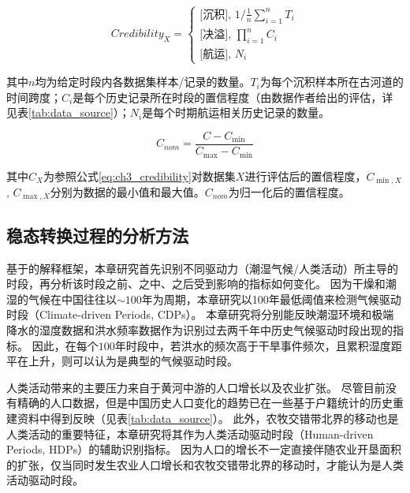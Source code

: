 

\begin{equation}
    \label{eq:ch3_credibility}
    Credibility_X = 
    \left\{\begin{array}{l}
        \text{[沉积], } 1 / \frac{1}{n} \sum_{i=1}^n T_i\\
        \text{[决溢], } \prod_{i=1}^n C_i\\
        \text{[航运], } N_i
    \end{array}\right.
\end{equation}

其中$n$均为给定时段内各数据集样本/记录的数量。$T_i$为每个沉积样本所在古河道的时间跨度；$C_i$是每个历史记录所在时段的置信程度（由数据作者给出的评估，详见表\ref{tab:data_source}）；$N_i$是每个时期航运相关历史记录的数量。

\begin{equation}
    \label{eq:ch3_normalize}
    C_{nom}=\frac{C-C_{\min}}{C_{\max}-C_{\min}}
\end{equation}

其中$C_{X}$为参照公式\ref{eq:ch3_credibility}对数据集$X$进行评估后的置信程度，$C_{\min, X}$, $C_{\max, X}$分别为数据的最小值和最大值。$C_{nom}$为归一化后的置信程度。

\subsection{稳态转换过程的分析方法}

基于的解释框架，本章研究首先识别不同驱动力（潮湿气候/人类活动）所主导的时段，再分析该时段之前、之中、之后受到影响的指标如何变化。
因为干燥和潮湿的气候在中国往往以$\sim100$年为周期\cite{GeQuanSheng2011}，本章研究以100年最低阈值来检测气候驱动时段（Climate-driven Periods, CDPs）。
本章研究将分别能反映潮湿环境和极端降水的湿度数据和洪水频率数据作为识别过去两千年中历史气候驱动时段出现的指标。
因此，在每个$100$年时段中，若洪水的频次高于干旱事件频次，且累积湿度距平在上升，则可以认为是典型的气候驱动时段。

人类活动带来的主要压力来自于黄河中游的人口增长以及农业扩张。
尽管目前没有精确的人口数据，但是中国历史人口变化的趋势已在一些基于户籍统计的历史重建资料中得到反映（见表\ref{tab:data_source}）。
此外，农牧交错带北界的移动也是人类活动的重要特征，本章研究将其作为人类活动驱动时段（Human-driven Periods, HDPs）的辅助识别指标。
因为人口的增长不一定直接伴随农业开垦面积的扩张，仅当同时发生农业人口增长和农牧交错带北界的移动时，才能认为是人类活动驱动时段。

